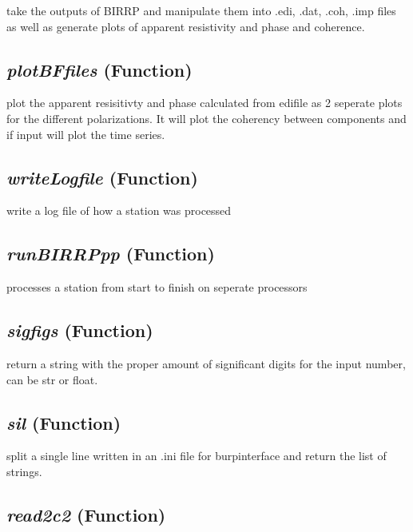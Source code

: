 take the outputs of BIRRP
    and manipulate them into .edi, .dat, .coh, .imp files as well as generate 
    plots of apparent resistivity and phase and coherence.

\subsection{\textit{plotBFfiles} (Function)}
\label{ssec:processing.birrptools.plotBFfiles}

plot the apparent resisitivty
    and phase calculated from edifile as 2 seperate plots for the different 
    polarizations.  It will plot the coherency between components and if input
    will plot the time series.

\subsection{\textit{writeLogfile} (Function)}
\label{ssec:processing.birrptools.writeLogfile}

 write a log file of how a station was processed
    

\subsection{\textit{runBIRRPpp} (Function)}
\label{ssec:processing.birrptools.runBIRRPpp}

processes a station from start to finish on seperate 
    processors

\subsection{\textit{sigfigs} (Function)}
\label{ssec:processing.birrptools.sigfigs}

return a string with the proper 
    amount of significant digits for the input number, can be str or float.

\subsection{\textit{sil} (Function)}
\label{ssec:processing.birrptools.sil}

split a single line written in an .ini file
    for burpinterface and return the list of strings.

\subsection{\textit{read2c2} (Function)}
\label{ssec:processing.birrptools.read2c2}

